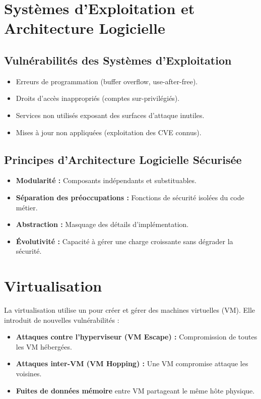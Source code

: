 \section{Systèmes d'Exploitation et Architecture Logicielle}

\subsection{Vulnérabilités des Systèmes d'Exploitation}
\begin{itemize}
    \item Erreurs de programmation (buffer overflow, use-after-free).
    \item Droits d'accès inappropriés (comptes sur-privilégiés).
    \item Services non utilisés exposant des surfaces d'attaque inutiles.
    \item Mises à jour non appliquées (exploitation des CVE connus).
\end{itemize}

\subsection{Principes d'Architecture Logicielle Sécurisée}
\begin{itemize}
    \item \textbf{Modularité :} Composants indépendants et substituables.
    \item \textbf{Séparation des préoccupations :} Fonctions de sécurité isolées du code métier.
    \item \textbf{Abstraction :} Masquage des détails d'implémentation.
    \item \textbf{Évolutivité :} Capacité à gérer une charge croissante sans dégrader la sécurité.
\end{itemize}

\section{Virtualisation}

La virtualisation utilise un  pour créer et gérer des machines virtuelles (VM). Elle introduit de nouvelles vulnérabilités :
\begin{itemize}
    \item \textbf{Attaques contre l'hyperviseur (VM Escape) :} Compromission de toutes les VM hébergées.
    \item \textbf{Attaques inter-VM (VM Hopping) :} Une VM compromise attaque les voisines.
    \item \textbf{Fuites de données mémoire} entre VM partageant le même hôte physique.
\end{itemize}

